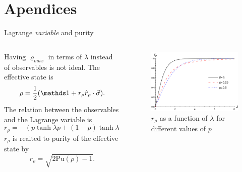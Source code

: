 \section{Apendices}

\begin{frame}{Lagrange \textit{variable} and purity}
    \begin{columns}
        \begin{column}{0.5\textwidth}
            Having $\varrho_{max}$ in terms of $\lambda$ instead of observables is not ideal. The effective state is
            \begin{equation*}
                \rho=\frac{1}{2}(\Id+r_{\rho}\hat{r}_{\rho}\cdot\vec{\sigma}).
            \end{equation*}
            The relation between the observables and the Lagrange variable is
            \begin{equation*}
                r_{\rho}=-(p\tanh{\lambda p}+(1-p)\tanh{\lambda (1-p)}).
            \end{equation*}
            $r_{\rho}$ is realted to purity of the effective state by
            \begin{equation*}
                r_{\rho}=\sqrt{2\text{Pu}(\rho)-1}.
            \end{equation*}
        \end{column}
        \begin{column}{0.5\textwidth}
            \begin{figure}[h!]
                \includegraphics[width=0.8\columnwidth]{figures/r(lambda).png}%
                \caption{$r_{\rho}$ as a function of $\lambda$ for different values of $p$}
            \end{figure}
        \end{column}
    \end{columns}
\end{frame}
